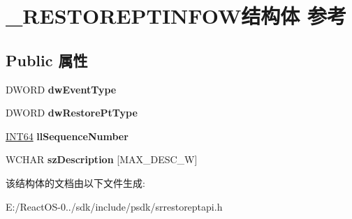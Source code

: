 \hypertarget{struct___r_e_s_t_o_r_e_p_t_i_n_f_o_w}{}\section{\+\_\+\+R\+E\+S\+T\+O\+R\+E\+P\+T\+I\+N\+F\+O\+W结构体 参考}
\label{struct___r_e_s_t_o_r_e_p_t_i_n_f_o_w}
\subsection*{Public 属性}
\begin{DoxyCompactItemize}
\item 
\mbox{\label{struct___r_e_s_t_o_r_e_p_t_i_n_f_o_w_abcafbf3a85107eb8fd9e7f3efbf72179}} 
D\+W\+O\+RD {\bfseries dw\+Event\+Type}
\item 
\mbox{\label{struct___r_e_s_t_o_r_e_p_t_i_n_f_o_w_af0b047cb13a290970ae4bde060ecd04e}} 
D\+W\+O\+RD {\bfseries dw\+Restore\+Pt\+Type}
\item 
\mbox{\label{struct___r_e_s_t_o_r_e_p_t_i_n_f_o_w_a0cf42843243f50cf76c679ec113c1b34}} 
\hyperlink{_processor_bind_8h_af16992cf571ce4103a92355761cc471e}{I\+N\+T64} {\bfseries ll\+Sequence\+Number}
\item 
\mbox{\label{struct___r_e_s_t_o_r_e_p_t_i_n_f_o_w_a2a20302852b010fa2fe2eb01e2ee5622}} 
W\+C\+H\+AR {\bfseries sz\+Description} \mbox{[}M\+A\+X\+\_\+\+D\+E\+S\+C\+\_\+W\mbox{]}
\end{DoxyCompactItemize}


该结构体的文档由以下文件生成\+:\begin{DoxyCompactItemize}
\item 
E\+:/\+React\+O\+S-\/0../sdk/include/psdk/srrestoreptapi.\+h\end{DoxyCompactItemize}
